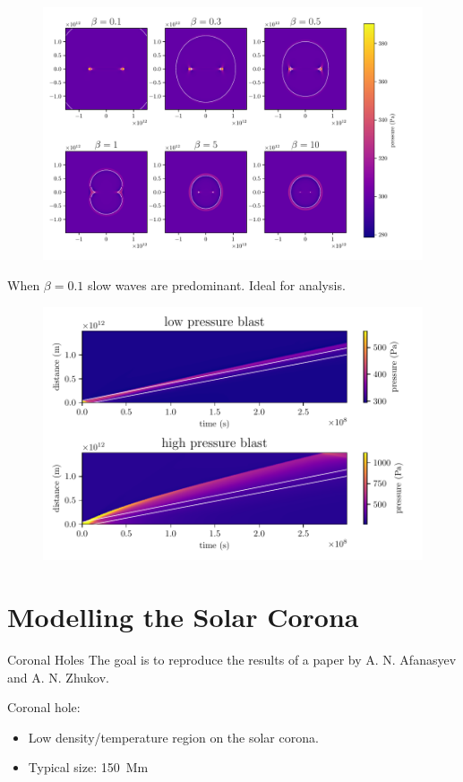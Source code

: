 \documentclass{beamer}
\begin{document}
\begin{frame}
	\begin{figure}[h]
		\centering
		\includegraphics[width=1.1\textwidth]{figures/comparison_groupspeed.pdf}
	\end{figure}
\end{frame}
\begin{frame}
	When $\beta = 0.1$ slow waves are predominant. Ideal for analysis. 
	\begin{figure}[h]
		\centering
		\includegraphics[width=\textwidth]{figures/slowwave_time.pdf}
	\end{figure}
\end{frame}
\section{Modelling the Solar Corona}
\begin{frame}{Coronal Holes}
   The goal is to reproduce the results of a paper by A. N. Afanasyev and A. N. Zhukov. 

   \bigskip 
   Coronal hole:
   \begin{itemize}
   	\item Low density/temperature region on the solar corona. 
	\item Typical size: \SI{150}{Mm}
   \end{itemize}
   
\end{frame}
\end{document}
